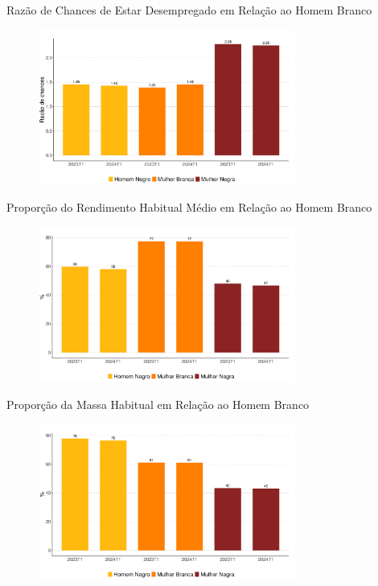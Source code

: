 \documentclass[10pt, xcolor=x11names,compress]{beamer}
\begin{document}
	\begin{frame}{Razão de Chances de Estar Desempregado em Relação ao Homem Branco}
		\begin{figure}
			\centering
			\includegraphics[width = 0.75\textwidth]{figures_output/frac_unemp.pdf}
		\end{figure}
	\end{frame}
	
	\begin{frame}{Proporção do Rendimento Habitual Médio em Relação ao Homem Branco}
		\begin{figure}
			\centering
			\includegraphics[width = 0.75\textwidth]{figures_output/frac_rendimento_habitual.pdf}
		\end{figure}
	\end{frame}

	\begin{frame}{Proporção da Massa Habitual em Relação ao Homem Branco}
		\begin{figure}
			\centering
			\includegraphics[width = 0.75\textwidth]{figures_output/frac_massa_habitual.pdf}
		\end{figure}
	\end{frame}
	
\end{document}
